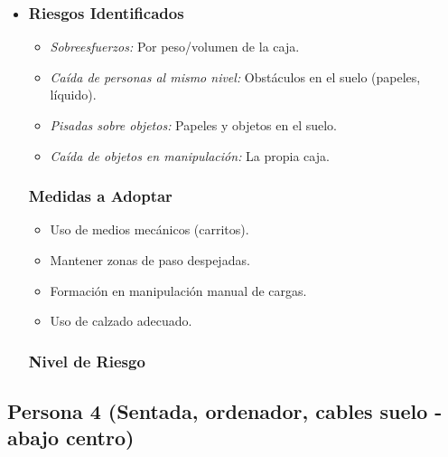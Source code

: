 \documentclass[12pt,a4paper]{article}
\begin{document}
	\begin{itemize}
		\item \subsubsection{Riesgos Identificados}
		\begin{itemize}
			\item \textit{Sobreesfuerzos:} Por peso/volumen de la caja.
			\item \textit{Caída de personas al mismo nivel:} Obstáculos en el suelo (papeles, líquido).
			\item \textit{Pisadas sobre objetos:} Papeles y objetos en el suelo.
			\item \textit{Caída de objetos en manipulación:} La propia caja.
		\end{itemize}
		\subsubsection{Medidas a Adoptar}
		\begin{itemize}
			\item Uso de medios mecánicos (carritos).
			\item Mantener zonas de paso despejadas.
			\item Formación en manipulación manual de cargas.
			\item Uso de calzado adecuado.
		\end{itemize}
		\subsubsection{Nivel de Riesgo}	
	\end{itemize}
	
	\hrulefill
	
	\subsection{Persona 4 (Sentada, ordenador, cables suelo - abajo centro)}
	\label{subsec:persona4} %
	
\end{document}

